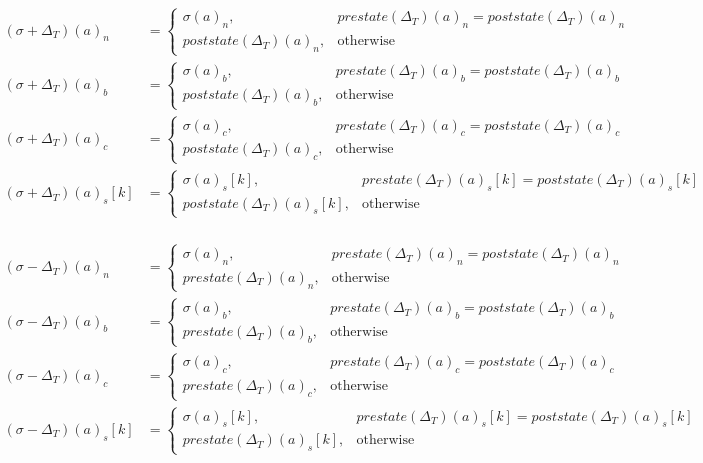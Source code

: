 \documentclass[draft,final]{vutinfth} %
\begin{document}
\begin{align*}
    (\sigma + \Delta_T)(a)_n    & =
    \begin{cases}
        \sigma(a)_n,              & prestate(\Delta_T)(a)_n = poststate(\Delta_T)(a)_n \\
        poststate(\Delta_T)(a)_n, & \text{otherwise}
    \end{cases}          \\
    (\sigma + \Delta_T)(a)_b    & =
    \begin{cases}
        \sigma(a)_b,              & prestate(\Delta_T)(a)_b = poststate(\Delta_T)(a)_b \\
        poststate(\Delta_T)(a)_b, & \text{otherwise}
    \end{cases}          \\
    (\sigma + \Delta_T)(a)_c    & =
    \begin{cases}
        \sigma(a)_c,              & prestate(\Delta_T)(a)_c = poststate(\Delta_T)(a)_c \\
        poststate(\Delta_T)(a)_c, & \text{otherwise}
    \end{cases}          \\
    (\sigma + \Delta_T)(a)_s[k] & =
    \begin{cases}
        \sigma(a)_s[k],              & prestate(\Delta_T)(a)_s[k] = poststate(\Delta_T)(a)_s[k] \\
        poststate(\Delta_T)(a)_s[k], & \text{otherwise}
    \end{cases} \\
\end{align*}

\begin{align*}
    (\sigma - \Delta_T)(a)_n    & =
    \begin{cases}
        \sigma(a)_n,             & prestate(\Delta_T)(a)_n = poststate(\Delta_T)(a)_n \\
        prestate(\Delta_T)(a)_n, & \text{otherwise}
    \end{cases}          \\
    (\sigma - \Delta_T)(a)_b    & =
    \begin{cases}
        \sigma(a)_b,             & prestate(\Delta_T)(a)_b = poststate(\Delta_T)(a)_b \\
        prestate(\Delta_T)(a)_b, & \text{otherwise}
    \end{cases}          \\
    (\sigma - \Delta_T)(a)_c    & =
    \begin{cases}
        \sigma(a)_c,             & prestate(\Delta_T)(a)_c = poststate(\Delta_T)(a)_c \\
        prestate(\Delta_T)(a)_c, & \text{otherwise}
    \end{cases}          \\
    (\sigma - \Delta_T)(a)_s[k] & =
    \begin{cases}
        \sigma(a)_s[k],             & prestate(\Delta_T)(a)_s[k] = poststate(\Delta_T)(a)_s[k] \\
        prestate(\Delta_T)(a)_s[k], & \text{otherwise}
    \end{cases} \\
\end{align*}
\end{document}
